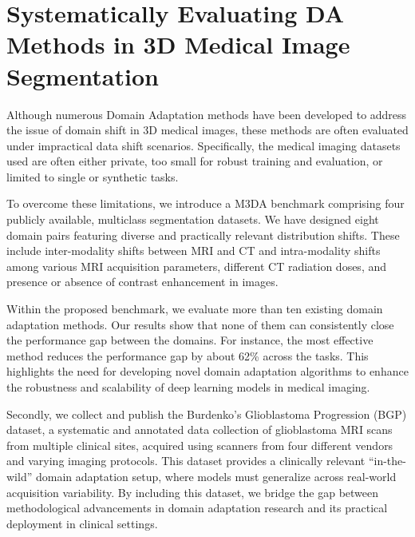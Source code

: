 

\chapter{Systematically Evaluating DA Methods in 3D Medical Image Segmentation}
\label{chap:da_bench}


Although numerous Domain Adaptation methods have been developed to address the issue of domain shift in 3D medical images, these methods are often evaluated under impractical data shift scenarios. Specifically, the medical imaging datasets used are often either private, too small for robust training and evaluation, or limited to single or synthetic tasks.

To overcome these limitations, we introduce a M3DA benchmark comprising four publicly available, multiclass segmentation datasets. We have designed eight domain pairs featuring diverse and practically relevant distribution shifts. These include inter-modality shifts between MRI and CT and intra-modality shifts among various MRI acquisition parameters, different CT radiation doses, and presence or absence of contrast enhancement in images.

Within the proposed benchmark, we evaluate more than ten existing domain adaptation methods. Our results show that none of them can consistently close the performance gap between the domains. For instance, the most effective method reduces the performance gap by about 62\% across the tasks. This highlights the need for developing novel domain adaptation algorithms to enhance the robustness and scalability of deep learning models in medical imaging.

Secondly, we collect and publish the Burdenko's Glioblastoma Progression (BGP) dataset, a systematic and annotated data collection of glioblastoma MRI scans from multiple clinical sites, acquired using scanners from four different vendors and varying imaging protocols. This dataset provides a clinically relevant ``in-the-wild'' domain adaptation setup, where models must generalize across real-world acquisition variability. By including this dataset, we bridge the gap between methodological advancements in domain adaptation research and its practical deployment in clinical settings.

